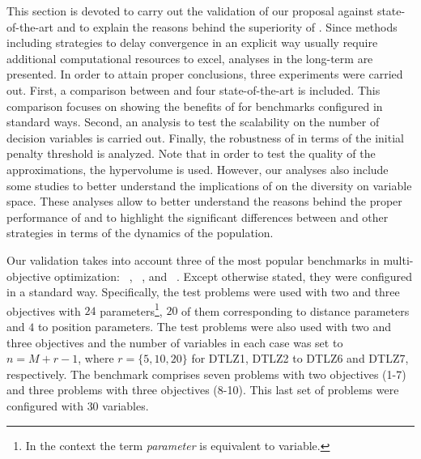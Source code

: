 This section is devoted to carry out the validation of our proposal against state-of-the-art \MOEAS{} and
to explain the reasons behind the superiority of \AVSDMOEAD{}.
%
%
Since methods including strategies to delay convergence in an explicit way usually require additional computational
resources to excel, analyses in the long-term are presented.
%
In order to attain proper conclusions, three experiments were carried out.
%
First, a comparison between \AVSDMOEAD{} and four state-of-the-art \MOEAS{} is included.
%
This comparison focuses on showing the benefits of \AVSDMOEAD{} for benchmarks 
configured in standard ways.
%
Second, an analysis to test the scalability on the number of decision variables is carried out.
%
Finally, the robustness of \AVSDMOEAD{} in terms of the initial penalty threshold is analyzed.
%
Note that in order to test the quality of the approximations, the hypervolume is used.
%
However, our analyses also include some studies to better understand
the implications of \AVSDMOEAD{} on the diversity on variable space.
%
These analyses allow to better understand the reasons behind the proper performance of \AVSDMOEAD{}
and to highlight the significant differences between \AVSDMOEAD{} and other strategies in terms of the dynamics
of the population.



Our validation takes into account three of the most popular benchmarks in multi-objective optimization:
\WFG{}~\cite{huband2006review}, \DTLZ{}~\cite{deb2005scalable}, and \UF{}~\cite{zhang2008multiobjective}.
%
Except otherwise stated, they were configured in a standard way.
%
Specifically, the \WFG{} test problems were used with two and three objectives with $24$ 
parameters\footnote{In the \WFG{} context the term \textit{parameter} is equivalent to variable.}, 
$20$ of them corresponding to distance parameters and $4$ to position parameters.
%
The \DTLZ{} test problems were also used with two and three objectives and the number of variables in each
case was set to $n=M+r-1$, where $r=\{5, 10, 20\}$ for DTLZ1, DTLZ2 to DTLZ6 and DTLZ7, respectively.
% 
The \UF{} benchmark comprises seven problems with two objectives (\UF{}1-7) and three problems with three objectives (\UF{}8-10).
%
This last set of problems were configured with $30$ variables.

